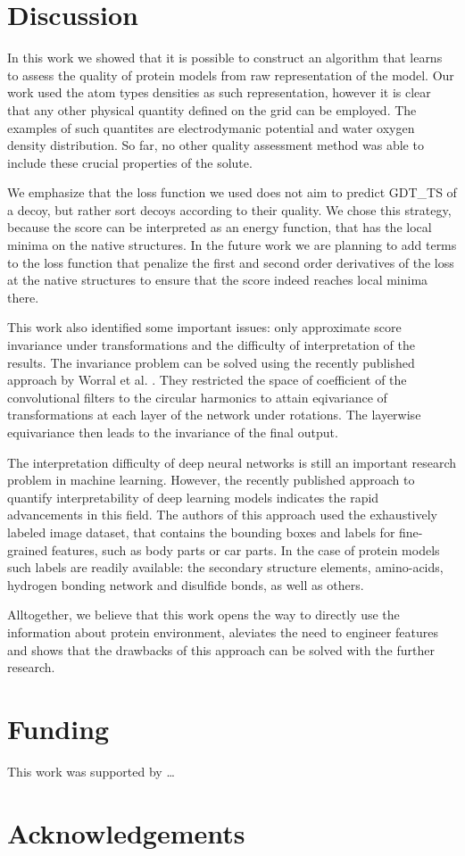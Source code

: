 \documentclass{bioinfo}
\begin{document}
\section{Discussion}
%
%
In this work we showed that it is possible to construct an algorithm that learns to assess the quality of protein models from 
raw representation of the model. Our work used the atom types densities as such representation, however it is clear that 
any other physical quantity defined on the grid can be employed. The examples of such quantites are electrodymanic potential and 
water oxygen density distribution. So far, no other quality assessment method was able to include these 
crucial properties of the solute.

We emphasize that the loss function we used does not aim to predict GDT\_TS of a decoy, but rather sort decoys according 
to their quality. We chose this strategy, because the score can be interpreted as an energy function, that has the local minima 
on the native structures. In the future work we are planning to add terms to the loss function that penalize the first and second order 
derivatives of the loss at the native structures to ensure that the score indeed reaches local minima there.

This work also identified some important issues: only approximate score invariance under transformations and the difficulty of 
interpretation of the results. The invariance problem can be solved using the recently published approach by Worral et al. \citep{worrall2016harmonic}.
They restricted the space of coefficient of the convolutional filters to the circular harmonics to attain eqivariance of transformations at each layer 
of the network under rotations. The layerwise equivariance then leads to the invariance of the final output.

The interpretation difficulty of deep neural networks is still an important research problem in machine learning. However, the recently 
published approach to quantify interpretability \citep{bau2017network} of deep learning models indicates the rapid advancements in this field. 
The authors of this approach used the exhaustively labeled image dataset, that contains the bounding boxes and labels for 
fine-grained features, such as body parts or car parts. In the case of protein models such labels are readily available: 
the secondary structure elements, amino-acids, hydrogen bonding network and disulfide bonds, as well as others.

Alltogether, we believe that this work opens the way to directly use the information about protein environment, aleviates the need to 
engineer features and shows that the drawbacks of this approach can be solved with the further research. 

\section*{Funding}
This work was supported by \dots

\section*{Acknowledgements}



\end{document}
